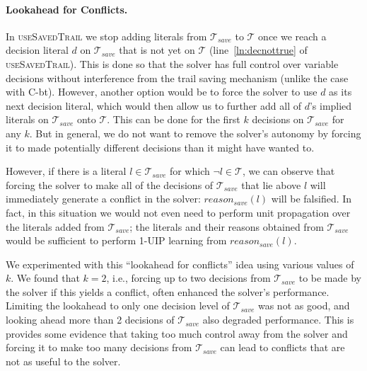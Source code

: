 \documentclass[runningheads]{llncs}
\newcommand{\trail}{\ensuremath{\mathcal{T}}}
\newcommand{\reasonsave}[1]{\ensuremath{\mathit{reason_{\mathit{save}}(#1)}}}
\newcommand{\cbt}{C-bt\xspace}
\newcommand{\trailsave}{\trail_{\mathit{save}}}
\newcommand{\ust}{\textsc{useSavedTrail}\xspace}
\begin{document}
\paragraph{Lookahead for Conflicts.}
In \ust we stop adding literals from $\trailsave$ to $\trail$ once we
reach a decision literal $d$ on $\trailsave$ that is not yet on
$\trail$ (line~\ref{ln:decnottrue} of \ust). This is done so that the
solver has full control over variable decisions without interference
from the trail saving mechanism (unlike the case with \cbt). However,
another option would be to force the solver to use $d$ as its next
decision literal, which would then allow us to further add all of
$d$'s implied literals on $\trailsave$ onto $\trail$. This can be done
for the first $k$ decisions on $\trailsave$ for any $k$. But in
general, we do not want to remove the solver's autonomy by forcing it
to made potentially different decisions than it might have wanted to.

However, if there is a literal $l\in\trailsave$ for which
$\lnot l\in \trail$, we can observe that forcing the solver to make
all of the decisions of $\trailsave$ that lie above $l$ will
immediately generate a conflict in the solver: $\reasonsave{l}$ will
be falsified. In fact, in this situation we would not even need to
perform unit propagation over the literals added from $\trailsave$;
the literals and their reasons obtained from $\trailsave$ would be
sufficient to perform 1-UIP learning from $\reasonsave{l}$.

We experimented with this ``lookahead for conflicts'' idea using
various values of $k$. We found that $k=2$, i.e., forcing up to two
decisions from $\trailsave$ to be made by the solver if this yields a
conflict, often enhanced the solver's performance. Limiting the lookahead to
only one decision level of $\trailsave$ was not as good, and looking
ahead more than 2 decisions of $\trailsave$ also degraded
performance. This is provides some evidence that taking too much
control away from the solver and forcing it to make too many decisions
from $\trailsave$ can lead to conflicts that are not as useful to the
solver.
\end{document}
